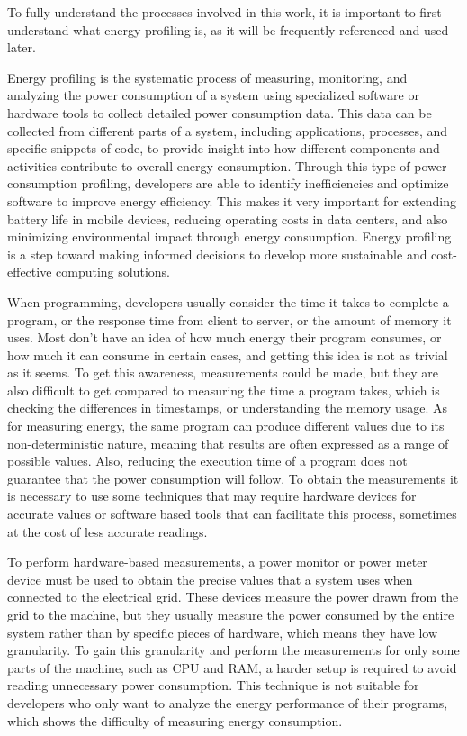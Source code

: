 \documentclass[sigplan]{acmart}
\begin{document}
To fully understand the processes involved in this work, it is important to first understand what energy profiling is, as it will be frequently referenced and used later.

Energy profiling is the systematic process of measuring, monitoring, and analyzing the power consumption of a system using specialized software or hardware tools to collect detailed power consumption data. This data can be collected from different parts of a system, including applications, processes, and specific snippets of code, to provide insight into how different components and activities contribute to overall energy consumption. Through this type of power consumption profiling, developers are able to identify inefficiencies and optimize software to improve energy efficiency. This makes it very important for extending battery life in mobile devices, reducing operating costs in data centers, and also minimizing environmental impact through energy consumption. Energy profiling is a step toward making informed decisions to develop more sustainable and cost-effective computing solutions.

When programming, developers usually consider the time it takes to complete a program, or the response time from client to server, or the amount of memory it uses. Most don't have an idea of how much energy their program consumes, or how much it can consume in certain cases, and getting this idea is not as trivial as it seems. To get this awareness, measurements could be made, but they are also difficult to get compared to measuring the time a program takes, which is checking the differences in timestamps, or understanding the memory usage. As for measuring energy, the same program can produce different values due to its non-deterministic nature, meaning that results are often expressed as a range of possible values. Also, reducing the execution time of a program does not guarantee that the power consumption will follow. To obtain the measurements it is necessary to use some techniques that may require hardware devices for accurate values or software based tools that can facilitate this process, sometimes at the cost of less accurate readings.

To perform hardware-based measurements, a power monitor or power meter device\cite{hackenberg2013power,ge2009powerpack} must be used to obtain the precise values that a system uses when connected to the electrical grid. These devices measure the power drawn from the grid to the machine, but they usually measure the power consumed by the entire system rather than by specific pieces of hardware, which means they have low granularity. To gain this granularity and perform the measurements for only some parts of the machine, such as CPU and RAM, a harder setup is required to avoid reading unnecessary power consumption. This technique is not suitable for developers who only want to analyze the energy performance of their programs, which shows the difficulty of measuring energy consumption.
\end{document}
